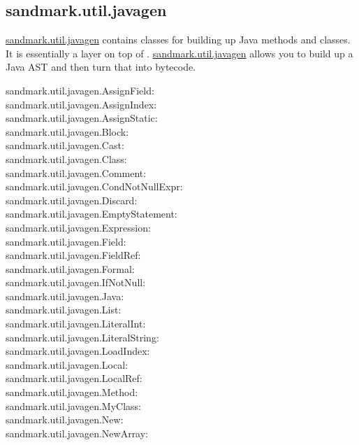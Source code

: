 \subsection{sandmark.util.javagen}
\url{sandmark.util.javagen} contains classes
for building up Java methods and classes.
It is essentially a layer on top of 
\BCEL. \url{sandmark.util.javagen}
allows you to build up a Java AST and
then turn that into bytecode.
\begin{description}
   \item[sandmark.util.javagen.AssignField:]
   \item[sandmark.util.javagen.AssignIndex:]
   \item[sandmark.util.javagen.AssignStatic:]
   \item[sandmark.util.javagen.Block:]
   \item[sandmark.util.javagen.Cast:]
   \item[sandmark.util.javagen.Class:]
   \item[sandmark.util.javagen.Comment:]
   \item[sandmark.util.javagen.CondNotNullExpr:]
   \item[sandmark.util.javagen.Discard:]
   \item[sandmark.util.javagen.EmptyStatement:]
   \item[sandmark.util.javagen.Expression:]
   \item[sandmark.util.javagen.Field:]
   \item[sandmark.util.javagen.FieldRef:]
   \item[sandmark.util.javagen.Formal:]
   \item[sandmark.util.javagen.IfNotNull:]
   \item[sandmark.util.javagen.Java:]
   \item[sandmark.util.javagen.List:]
   \item[sandmark.util.javagen.LiteralInt:]
   \item[sandmark.util.javagen.LiteralString:]
   \item[sandmark.util.javagen.LoadIndex:]
   \item[sandmark.util.javagen.Local:]
   \item[sandmark.util.javagen.LocalRef:]
   \item[sandmark.util.javagen.Method:]
   \item[sandmark.util.javagen.MyClass:]
   \item[sandmark.util.javagen.New:]
   \item[sandmark.util.javagen.NewArray:]

\end{description}
